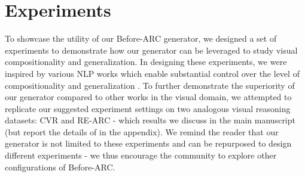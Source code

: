 \section{Experiments}

To showcase the utility of our Before-ARC generator, we designed a set of experiments to demonstrate how our generator can be leveraged to study visual compositionality and generalization. In designing these experiments, we were inspired by various NLP works which enable substantial control over the level of compositionality and generalization \cite{SCAN_lake_baroni, keysers2019measuring,kim2020cogs}. To further demonstrate the superiority of our generator compared to other works in the visual domain, we attempted to replicate our suggested experiment settings on two analogous visual reasoning datasets: CVR \cite{cvr2022} and RE-ARC \cite{reverse_engineer_hodel} - which results we discuss in the main manuscript (but report the details of in the appendix). We remind the reader that our generator is not limited to these experiments and can be repurposed to design different experiments - we thus encourage the community to explore other configurations of Before-ARC. 






